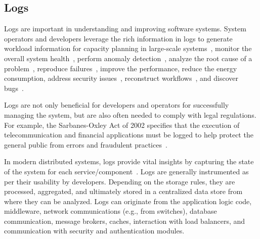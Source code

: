 \subsection{Logs} \label{ch:background:sec:observability:subsec:logs}
Logs are important in understanding and improving software systems. System operators and developers leverage the rich information in logs to generate workload information for capacity planning in large-scale systems~\cite{hassan2008industrial,nagappan2009efficiently}, monitor the overall system health~\cite{jiang2013automated}, perform anomaly detection~\cite{meng2019loganomaly,nedelkoski2019anomaly,nedelkoski2020loganomaly,nedelkoski2020selfsupervised,du2017deeplog,zhang2019robust,du2016spell,zhu2019tools}, analyze the root cause of a problem~\cite{Yuan2019AnAT,zhou2019latent,chen2019empirical}, reproduce failures~\cite{zhang2017pensieve}, improve the performance, reduce the energy consumption, address security issues~\cite{zhao2016non}, reconstruct workflows~\cite{bao2019miningworkflows}, and discover bugs~\cite{mohan2018finding}.

Logs are not only beneficial for developers and operators for successfully managing the system, but are also often needed to comply with legal regulations. For example, the Sarbanes-Oxley Act of 2002 specifies that the execution of telecommunication and financial applications must be logged to help protect the general public from errors and fraudulent practices~\cite{act2002sarbanes}.

In modern distributed systems, logs provide vital insights by capturing the state of the system for each service/component~\cite{zhu2019tools}. Logs are generally instrumented as per their usability by developers. Depending on the storage rules, they are processed, aggregated, and ultimately stored in a centralized data store from where they can be analyzed. Logs can originate from the application logic code, middleware, network communications (e.g., from switches), database communication, message brokers, caches, interaction with load balancers, and communication with security and authentication modules\cite{observability2020practical}. 


